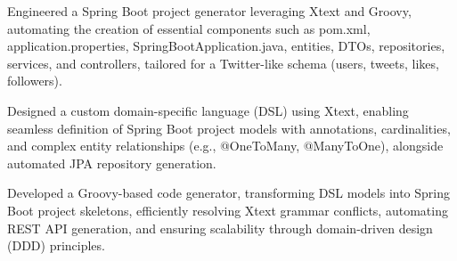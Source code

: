 \vspace{4pt}
\begin{tightemize}
    \item Engineered a Spring Boot project generator leveraging Xtext and Groovy, automating the creation of essential components such as pom.xml, application.properties, SpringBootApplication.java, entities, DTOs, repositories, services, and controllers, tailored for a Twitter-like schema (users, tweets, likes, followers).
    \item Designed a custom domain-specific language (DSL) using Xtext, enabling seamless definition of Spring Boot project models with annotations, cardinalities, and complex entity relationships (e.g., @OneToMany, @ManyToOne), alongside automated JPA repository generation.
    \item Developed a Groovy-based code generator, transforming DSL models into Spring Boot project skeletons, efficiently resolving Xtext grammar conflicts, automating REST API generation, and ensuring scalability through domain-driven design (DDD) principles.
\end{tightemize}
